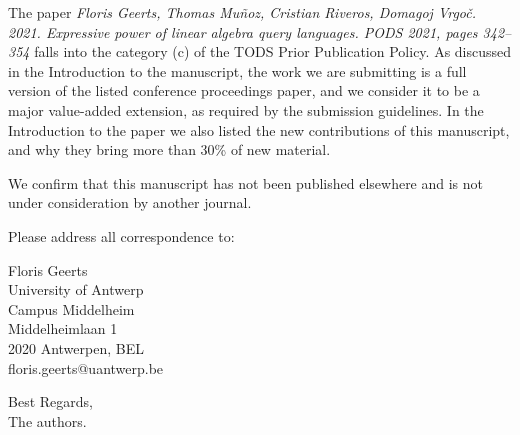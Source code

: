 \documentclass[11pt]{letter}
\begin{document}
\medskip

 The paper {\em Floris Geerts, Thomas Mu\~noz, Cristian Riveros,  Domagoj Vrgo\v{c}. 2021. 
Expressive power of linear algebra query languages. PODS 2021, pages 342--354} falls into the category (c) of the TODS Prior Publication Policy. As discussed in the Introduction to the manuscript, the work we are submitting is a full version of the listed conference proceedings paper, and we consider it to be a major value-added extension, as required by the submission guidelines. In the Introduction to the paper we also listed the new contributions of this manuscript, and why they bring more than 30\% of new material.

\medskip


We confirm that this manuscript has not been published elsewhere and is not under consideration by another journal.

Please address all correspondence to:

Floris Geerts\\
University of Antwerp\\
Campus Middelheim\\
Middelheimlaan 1\\
2020 Antwerpen, BEL\\
floris.geerts@uantwerp.be




\vspace*{1cm}


Best Regards,\\
The authors.
\end{document}
